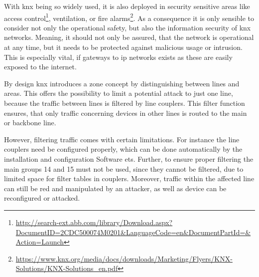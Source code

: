 With \gls{knx} being so widely used, it is also deployed in security sensitive areas like access control\footnote{\url{http://search-ext.abb.com/library/Download.aspx?DocumentID=2CDC500074M0201&LanguageCode=en&DocumentPartId=&Action=Launch}}, ventilation, or fire alarms\footnote{\url{https://www.knx.org/media/docs/downloads/Marketing/Flyers/KNX-Solutions/KNX-Solutions_en.pdf}}.
As a consequence it is only sensible to consider not only the operational safety, but also the information security of \gls{knx} networks. Meaning, it should not only be assured, that the network is operational at any time, but it needs to be protected against malicious usage or intrusion.
This is especially vital, if gateways to \gls{ip} networks exists as these are easily exposed to the internet.

By design \gls{knx} introduces a zone concept by distinguishing between lines and areas.
This offers the possibility to limit a potential attack to just one line, because the traffic between lines is filtered by line couplers.
This filter function ensures, that only traffic concerning devices in other lines is routed to the main or backbone line.

However, filtering traffic comes with certain limitations. For instance the line couplers need be configured properly, which can be done automatically by the installation and configuration Software \gls{ets}. \parencite{Merz2009}
Further, to ensure proper filtering the main groups 14 and 15 must not be used, since they cannot be filtered, due to limited space for filter tables in couplers. \parencite{Hubner2009}
Moreover, traffic within the affected line can still be red and manipulated by an attacker, as well as device can be reconfigured or attacked.

